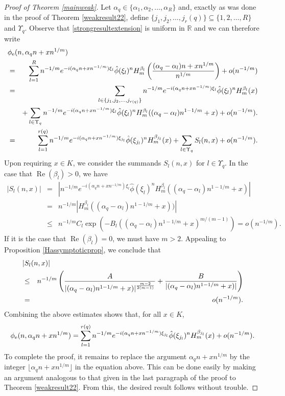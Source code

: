 \documentclass{article}
\theoremstyle{theorem}
\theoremstyle{remark}
\renewcommand\Re{\operatorname{Re}}%
\begin{document}
\begin{proof}[Proof of Theorem \ref{mainweak}]
Let $\alpha_q\in\{\alpha_1,\alpha_2,\dots,\alpha_R\}$ and, exactly as was done in the proof of Theorem \ref{weakresult22}, define $\{j_1,j_2,\dots,j_r(q)\}\subseteq\{1,2,\dots, R\}$ and $\Upsilon_q$.   Observe that \eqref{strongresultextension} is uniform in $\mathbb{R}$ and we can therefore write
\begin{eqnarray*}
\lefteqn{\phi_{\mbox{\scriptsize{e}}}(n,\alpha_qn+xn^{1/m})}\\
&=&\sum_{l=1}^{R}n^{-1/m}e^{-i(\alpha_qn+xn^{-1/m})\xi_l}\hat{\phi}(\xi_l)^n H_m^{\beta_l}\left(\frac{(\alpha_q-\alpha_l)n+xn^{1/m}}{n^{1/m}}\right)+o(n^{-1/m})\\
&=& \sum_{l\in\{j_1,j_2,\dots,j_{r(q)}\}}n^{-1/m}e^{-i(\alpha_qn+xn^{-1/m})\xi_l}\hat{\phi}(\xi_l)^n H_m^{\beta_l}(x)\\
&&+ \sum_{l\in\Upsilon_q}n^{-1/m}e^{-i(\alpha_qn+xn^{-1/m})\xi_l}\hat{\phi}(\xi_l)^n H_m^{\beta_l}((\alpha_q-\alpha_l)n^{1-1/m}+x)+o(n^{-1/m}).\\
&=&\sum_{l=1}^{r(q)}n^{-1/m}e^{-i(\alpha_qn+xn^{-1/m})\xi_{j_l}}\hat{\phi}(\xi_{j_l})^n H_m^{\beta_{j_l}}(x)+\sum_{l\in\Upsilon_q}S_l(n,x)+o(n^{-1/m}).
\end{eqnarray*}
Upon requiring $x\in K$, we consider the summands $S_l(n,x)$ for $l\in\Upsilon_q$. In the case that $\Re(\beta_l)>0$, we have
\begin{eqnarray*}
|S_l(n,x)|&=&|n^{-1/m}e^{-i(\alpha_qn+xn^{-1/m})\xi_l}\hat{\phi}(\xi_l)^n H_m^{\beta_l}((\alpha_q-\alpha_l)n^{1-1/m}+x)|\\
&=&n^{-1/m}|H_m^{\beta_l}((\alpha_q-\alpha_l)n^{1-1/m}+x))|\\
&\leq& n^{-1/m} C_l\exp(-B_l((\alpha_q-\alpha_l)n^{1-1/m}+x)^{m/(m-1)})=o(n^{-1/m}).
\end{eqnarray*}
If it is the case that $\Re(\beta_l)=0$, we must have $m>2$. Appealing to Proposition \ref{Hassymptoticprop}, we conclude that
\begin{eqnarray*}
\lefteqn{|S_l(n,x)|}\\
&\leq& n^{-1/m}\left(\frac{A}{|(\alpha_q-\alpha_l)n^{1-1/m}+x)|^{\frac{m-2}{2(m-1)}}}+\frac{B}{|(\alpha_q-\alpha_l)n^{1-1/m}+x)|}\right)\\
&=&o(n^{-1/m}).
\end{eqnarray*}
Combining the above estimates shows that, for all $x\in K$,
\begin{equation*}
\phi_{\mbox{\scriptsize{e}}}(n,\alpha_qn+xn^{1/m})=\sum_{l=1}^{r(q)}n^{-1/m}e^{-i(\alpha_qn+xn^{-1/m})\xi_{j_l}}\hat{\phi}(\xi_{j_l})^n H_m^{\beta_{j_l}}(x)
+o(n^{-1/m}).
\end{equation*}
To complete the proof, it remains to replace the argument $\alpha_qn+xn^{1/m}$ by the integer $\lfloor\alpha_qn+xn^{1/m}\rfloor$ in the equation above. This can be done easily by making an argument analogous to that given in the last paragraph of the proof to Theorem \ref{weakresult22}. From this, the desired result follows without trouble.
\end{proof}
\end{document}
